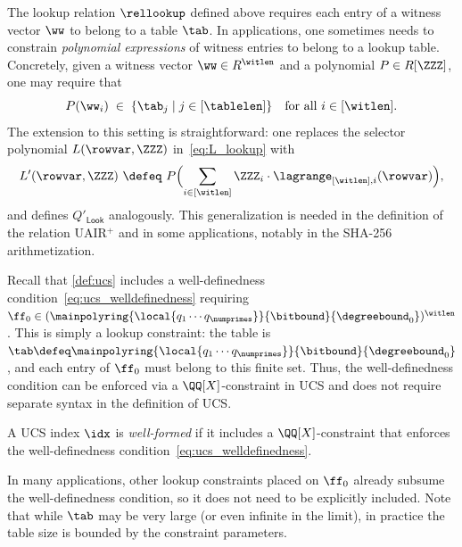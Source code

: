 \begin{remark}
\label{rem:lookup_algebraic_combinations}
The lookup relation $\rellookup$ defined above requires each entry of a witness vector $\ww$ to belong to a table $\tab$.
In applications, one sometimes needs to constrain \emph{polynomial expressions} of witness entries to belong to a lookup table.
Concretely, given a witness vector $\ww\in R^{\witlen}$ and a polynomial $P\in R[\ZZZ]$, one may require that 
\[
  P(\ww_i)
  \;\in\; \{\tab_j \mid j\in[\tablelen]\}
  \quad\text{for all } i\in[\witlen].
\]
The extension to this setting is straightforward: one replaces the selector polynomial $L(\rowvar,\ZZZ)$ in~\eqref{eq:L_lookup} with
\[
  L'(\rowvar,\ZZZ)
  \ \defeq\
  P\Bigl(\sum_{i\in[\witlen]} \ZZZ_i \cdot \lagrange_{[\witlen],i}(\rowvar)\Bigr),
\]
and defines $Q'_{\mathsf{Look}}$ analogously.
This generalization is needed in the definition of the relation UAIR$^+$ and in some applications, notably in the SHA-256 arithmetization.
\end{remark}

\begin{remark}
\label{rem:well_defined_as_lookup}
\label{sss:well_defined_condition}
Recall that \cref{def:ucs} includes a well-definedness condition~\eqref{eq:ucs_welldefinedness} requiring $\ff_0\in(\mainpolyring{\local{q_1\cdots q_{\numprimes}}}{\bitbound}{\degreebound_0})^{\witlen}$.
This is simply a lookup constraint: the table is $\tab\defeq\mainpolyring{\local{q_1\cdots q_{\numprimes}}}{\bitbound}{\degreebound_0}$, and each entry of $\ff_0$ must belong to this finite set. Thus, the well-definedness condition can be enforced via a $\QQ[X]$-constraint in UCS and does not require separate syntax in the definition of UCS.
\begin{definition}
\label{def:ucs_well_formed_index}
A UCS index $\idx$ is \emph{well-formed} if it includes a $\QQ[X]$-constraint that enforces the well-definedness condition~\eqref{eq:ucs_welldefinedness}.
\end{definition}

In many applications, other lookup constraints placed on $\ff_0$ already subsume the well-definedness condition, so it does not need to be explicitly included.
Note that while $\tab$ may be very large (or even infinite in the limit), in practice the table size is bounded by the constraint parameters.
\end{remark}




